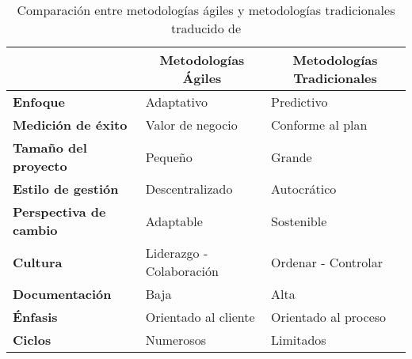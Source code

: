 \begin{table}[H]
    \centering
    \caption[Comparación entre metodologías ágiles y metodologías tradicionales]{Comparación entre metodologías ágiles y metodologías tradicionales traducido de \cite{islam_comparison_2020} }\label{tab:table_agil_vs_tradicional}
    \renewcommand*{\arraystretch}{1.4}
    \begin{tabular}{ |>{\bfseries}l|l|l| }
        \hline
        \multicolumn{1}{|c|}{ \textbf{Característica}} & \multicolumn{1}{c|}{\textbf{Metodologías Ágiles}} & \multicolumn{1}{c|}{ \textbf{Metodologías Tradicionales}} \\
        \hline
        Enfoque                                      & Adaptativo                                       & Predictivo                                               \\
        \hline
        Medición de éxito                            & Valor de negocio                                 & Conforme al plan                                         \\
        \hline
        Tamaño
        del proyecto                                & Pequeño                                           & Grande                                                   \\
        \hline
        Estilo de gestión                            & Descentralizado                                  & Autocrático                                              \\
        \hline
        Perspectiva de cambio                        & Adaptable                                        & Sostenible                                 \\
        \hline
        Cultura                                      & Liderazgo - Colaboración                         & Ordenar - Controlar                                      \\
        \hline
        Documentación                                & Baja                                             & Alta                                                     \\
        \hline
        Énfasis                                      & Orientado al cliente                             & Orientado al proceso                                     \\
        \hline
        Ciclos                                       & Numerosos                                        & Limitados                                                \\

\end{tabular}
\end{table}
